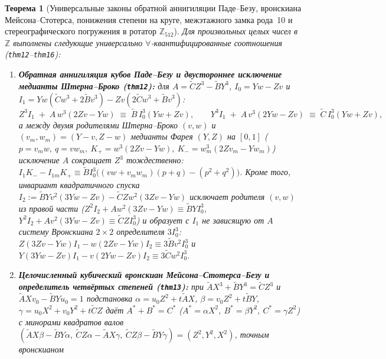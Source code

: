 \documentclass[11pt,a4paper]{article}
\theoremstyle{plain}
\newtheorem{theorem}{Теорема}[section]
\theoremstyle{definition}
\begin{document}
\begin{theorem}[Универсальные законы обратной аннигиляции Паде--Безу, вронскиана Мейсона--Стотерса, понижения степени на круге, межэтажного замка рода~10 и стереографического погружения в ротатор $\mathbb{Z}_{512}$]
\label{thm:main-12-16}
Для произвольных целых чисел в $\mathbb{Z}$ выполнены следующие универсально $\forall$-квантифицированные соотношения (\texttt{thm12}--\texttt{thm16}):
\begin{enumerate}[label=\textbf{(\roman*)},leftmargin=*]
\item \textbf{Обратная аннигиляция кубов Паде--Безу и двустороннее исключение медианты Штерна--Броко (\texttt{thm12}):}
  для $A = \widetilde{C}Z^3 - \widetilde{B}Y^3$, $I_0 = Yw - Zv$ и $I_1 = Yw(\widetilde{C}w^3+2\widetilde{B}v^3) - Zv(2\widetilde{C}w^3+\widetilde{B}v^3)$:
  \begin{equation}
    \label{eq:reverse-pade-bezout}
    Z^3 I_1 \;+\; A\,w^3(2Zv - Yw) \;\equiv\; \widetilde{B}\,I_0^3(Yw + Zv),\qquad
    Y^3 I_1 \;+\; A\,v^3(2Yw - Zv) \;\equiv\; \widetilde{C}\,I_0^3(Yw + Zv),
  \end{equation}
  а между двумя родителями Штерна--Броко $(v,w)$ и $(v_m,w_m) = (Y-v,Z-w)$ медианты Фарея $(Y,Z)$ на $[0,1]$ ($p = v_m w,\ q = v w_m,\ K_+ = w^3(2Zv-Yw),\ K_- = w_m^3(2Zv_m-Yw_m)$) исключение $A$ сокращает $Z^3$ тождественно: $I_1 K_- - I_{1m} K_+ \equiv \widetilde{B} I_0^3\bigl((vw + v_m w_m)(p+q) - (p^2+q^2)\bigr)$. Кроме того, инвариант квадратичного спуска $I_2 := \widetilde{B}Yv^2(3Yw-Zv) - \widetilde{C}Zw^2(3Zv-Yw)$ исключает родителя $(v,w)$ из правой части ($Z^2 I_2 + A w^2(3Zv-Yw) \equiv \widetilde{B}Y I_0^3$, $Y^2 I_2 + A v^2(3Yw-Zv) \equiv \widetilde{C}Z I_0^3$) и образует с $I_1$ не зависящую от $A$ систему Вронскиана $2\times 2$ определителя $3 I_0^3$: $Z(3Zv-Yw)I_1 - w(2Zv-Yw)I_2 \equiv 3\widetilde{B}v^2 I_0^3$ и $Y(3Yw-Zv)I_1 - v(2Yw-Zv)I_2 \equiv 3\widetilde{C}w^2 I_0^3$.
\item \textbf{Целочисленный кубический вронскиан Мейсона--Стотерса--Безу и определитель четвёртых степеней (\texttt{thm13}):}
  при $\widetilde{A}X^3 + \widetilde{B}Y^3 = \widetilde{C}Z^3$ и $\widetilde{A}Xv_0 - \widetilde{B}Yu_0 = 1$ подстановка $\alpha = u_0 Z^2 + t\widetilde{A}X$, $\beta = v_0 Z^2 + t\widetilde{B}Y$, $\gamma = u_0 X^2 + v_0 Y^2 + t\widetilde{C}Z$ даёт $A^*+B^*=C^*$ ($A^*=\alpha X^2,\ B^*=\beta Y^2,\ C^*=\gamma Z^2$) с минорами квадратов валов $(\widetilde{A}X\beta-\widetilde{B}Y\alpha,\ \widetilde{C}Z\alpha-\widetilde{A}X\gamma,\ \widetilde{C}Z\beta-\widetilde{B}Y\gamma) = (Z^2,Y^2,X^2)$, точным вронскианом

\end{enumerate}
\end{theorem}
\end{document}
